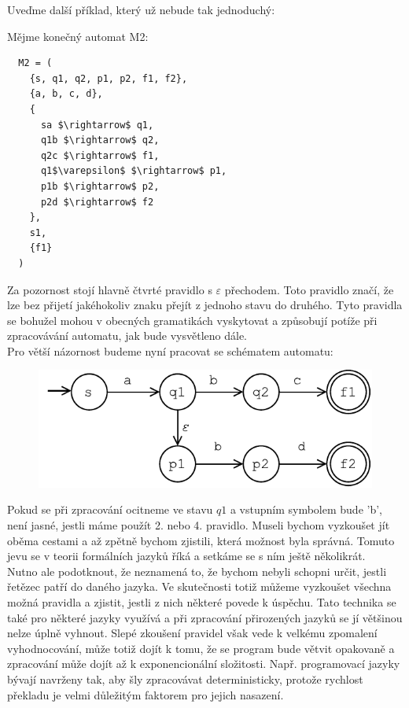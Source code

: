 \noindent
Uveďme další příklad, který už nebude tak jednoduchý:
\begin{exmp}
  Mějme konečný automat M2:
  \begin{lstlisting}
  M2 = (
    {s, q1, q2, p1, p2, f1, f2},
    {a, b, c, d},
    {
      sa $\rightarrow$ q1,
      q1b $\rightarrow$ q2,
      q2c $\rightarrow$ f1,
      q1$\varepsilon$ $\rightarrow$ p1,
      p1b $\rightarrow$ p2,
      p2d $\rightarrow$ f2
    },
    s1,
    {f1}
  )
  \end{lstlisting}

  Za pozornost stojí hlavně čtvrté pravidlo s $\varepsilon$ přechodem.
  Toto pravidlo značí, že lze bez přijetí jakéhokoliv znaku přejít z jednoho stavu
  do druhého. Tyto pravidla se bohužel mohou v obecných gramatikách vyskytovat a
  způsobují potíže při zpracovávání automatu, jak bude vysvětleno dále.\\

  \noindent
  Pro větší názornost budeme nyní pracovat se schématem automatu:

  \begin{figure}[H]
    \centering
    \includegraphics{fig/finiteAutomat1.pdf}
  \end{figure}

  Pokud se při zpracování ocitneme ve stavu $q1$ a vstupním symbolem bude 'b',
  není jasné, jestli máme použít 2. nebo 4. pravidlo. Museli bychom vyzkoušet jít oběma cestami
  a až zpětně bychom zjistili, která možnost byla správná. Tomuto jevu se v teorii
  formálních jazyků říká  a setkáme
  se s ním ještě několikrát.\\

  Nutno ale podotknout, že  neznamená to, že bychom nebyli schopni
  určit, jestli řetězec patří do daného jazyka. Ve skutečnosti totiž můžeme
  vyzkoušet všechna možná pravidla a zjistit, jestli z nich některé povede k úspěchu.
  Tato technika se také pro některé jazyky využívá a při zpracování
  přirozených jazyků se jí většinou nelze úplně vyhnout.
  Slepé zkoušení pravidel však vede k velkému zpomalení vyhodnocování,
  může totiž dojít k tomu, že se program bude větvit opakovaně
  a zpracování může dojít až k exponencionální složitosti.
  Např. programovací jazyky bývají navrženy tak, aby šly zpracovávat deterministicky,
  protože rychlost překladu je velmi důležitým faktorem pro jejich nasazení.

\end{exmp}

